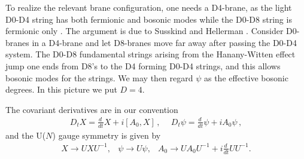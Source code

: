 \documentclass[a4paper,12pt]{article}
\begin{document}
To realize the relevant brane configuration, one needs a D4-brane, as the light D0-D4 string has both fermionic
and bosonic modes while   the   D0-D8 string is fermionic only \cite{9712086,polchinski}. The argument is due to
Susskind and Hellerman \cite{Lenny,0107200}.  Consider D0-branes in a D4-brane and  let D8-branes move far away
after passing the D0-D4 system. The  D0-D8 fundamental strings arising from the Hanany-Witten effect jump one ends
from D8's to the D4 forming D0-D4 strings, and this allows bosonic modes for the strings. We may then regard
$\psi$ as the effective  bosonic degrees. In this picture we put $D=4$.\newline






The covariant derivatives are in our convention
\begin{equation}
\begin{array}{cc}
D_{t}X=\frac{d\,}{dt}X+i[A_{0},X]\,,~&~D_{t}\psi=\frac{d\,}{dt}\psi+iA_{0}\psi\,,
\end{array}
\end{equation}
and the U($N$) gauge symmetry is given by
\begin{equation}
\begin{array}{ccc}
X\rightarrow UXU^{-1},&\psi\rightarrow U\psi,&A_{0}\rightarrow UA_{0}U^{-1}+i\frac{d\,}{dt}UU^{-1}.
\end{array}
\end{equation}
\end{document}
